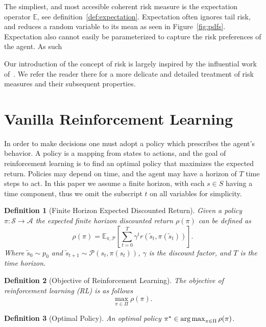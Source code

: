\documentclass[10pt]{article}
\newtheorem{definition}{Definition}
\renewcommand{\cite}{\citep}
\theoremstyle{plain}
\theoremstyle{remark}
\begin{document}
The simpliest, and most accesible coherent risk measure is the expectation operator $\mathbb{E}$, see definition~\ref{def:expectation}. \label{sec:explanation-of-why-risk-measures-are-important}
Expectation often ignores tail risk, and reduces a random variable to its mean as seen in Figure~\ref{fig:pdfs}.
Expectation also cannot easily be parameterized to capture the risk preferences of the agent.
As such


Our introduction of the concept of risk is largely inspired by the influential work of~\cite{follmer2016}. We refer the reader there for a more delicate and detailed treatment of risk measures and their subsequent properties.

\section{Vanilla Reinforcement Learning}

In order to make decisions one must adopt a policy which prescribes the agent's behavior.
A policy is a mapping from states to actions, and the goal of reinforcement learning is to find an optimal policy that maximizes the expected return.
Policies may depend on time, and the agent may have a horizon of $T$ time steps to act. 
In this paper we assume a finite horizon, with each $s \in S$ having a time component, thus we omit the subscript $t$ on all variables for simplicity.

\begin{definition}[Finite Horizon Expected Discounted Return]
        Given a policy $\pi : \mathcal{S} \to \mathcal{A}$ the expected finite horizon discounted return $\rho(\pi)$ can be defined as
        \[ 
          \rho(\pi) = \mathbb{E}_{\pi, \mathcal{P}} \left[ \sum_{t=0}^{T} \gamma^t r(\tilde{s}_t, \pi(\tilde{s}_t)) \right].
        \]
        Where $\tilde{s}_0 \sim p_0$ and $\tilde{s}_{t+1} \sim \mathcal{P}(s_t, \pi(s_t))$, $\gamma$ is the discount factor, and $T$ is the time horizon.
\end{definition}

\begin{definition}[Objective of Reinforcement Learning]\label{def:rl_obj}
        The objective of reinforcement learning (RL) is as follows
        \[
        \max_{\pi \in \Pi} \rho(\pi). 
        \]
\end{definition}

\begin{definition}[Optimal Policy]\label{def:optimal_policy}
        An optimal policy $\pi^\star \in \operatorname*{arg\,max}_{\pi \in \Pi} \rho(\pi)$.
\end{definition}
\end{document}
